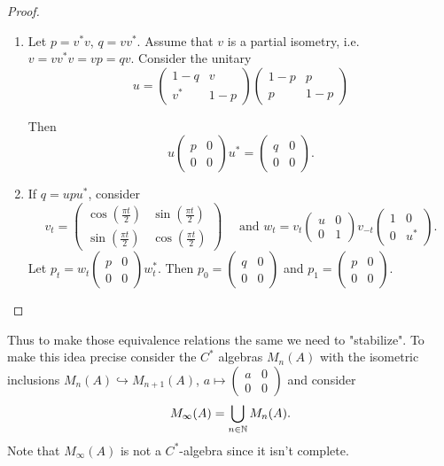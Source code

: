 \begin{proof}\noindent 
 \begin{enumerate}
  \item Let $p=v^\ast v$, $q=vv^\ast$. Assume that $v$ is a partial isometry, i.e. $v=vv^\ast v=vp=qv$. Consider the unitary $$u=\begin{pmatrix} 1-q & v \\ v^\ast & 1-p\end{pmatrix}\begin{pmatrix} 1-p & p \\ p & 1-p\end{pmatrix}$$

 Then $$u\begin{pmatrix} p & 0 \\ 0 & 0\end{pmatrix}u^\ast=\begin{pmatrix} q & 0 \\ 0 & 0\end{pmatrix}.$$
 \item If $q=upu^\ast$, consider $$v_t=\begin{pmatrix} \cos(\frac{\pi t}2) & \sin(\frac{\pi t}2) \\ \sin(\frac{\pi t}2) & \cos(\frac{\pi t}2)\end{pmatrix}\quad \text{ and }w_t=v_t\begin{pmatrix} u & 0 \\ 0 & 1\end{pmatrix}v_{-t}\begin{pmatrix} 1 & 0 \\ 0 & u^\ast\end{pmatrix}.$$
 Let $p_t=w_t\begin{pmatrix} p & 0 \\ 0 & 0\end{pmatrix}w_t^\ast$. Then $p_0=\begin{pmatrix} q & 0 \\ 0 & 0\end{pmatrix}$ and $p_1=\begin{pmatrix} p & 0 \\ 0 & 0\end{pmatrix}.$
  \end{enumerate}
\end{proof}

\noindent Thus to make those equivalence relations the same we need to "stabilize". To make this idea precise consider the $C^\ast$ algebras $M_n(A)$ with the isometric inclusions $M_n(A)\hookrightarrow M_{n+1}(A)$, $a\mapsto\begin{pmatrix} a & 0\\0 & 0\end{pmatrix}$ and consider $$M_\infty(A)=\bigcup_{n\in\mathbb{N}}M_n(A).$$ Note that $M_\infty(A)$ is not a $C^\ast$-algebra since it isn't complete. 


